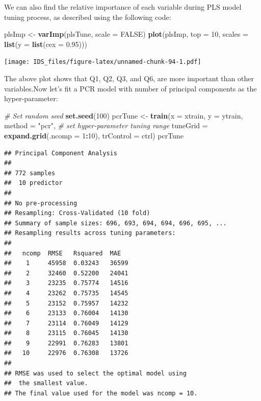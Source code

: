 \documentclass[12pt,]{krantz}
\makeatletter
\newenvironment{Shaded}{\begin{snugshade}}{\end{snugshade}}
\newcommand{\CommentTok}[1]{\textcolor[rgb]{0.37,0.37,0.37}{\textit{#1}}}
\newcommand{\DataTypeTok}[1]{\textcolor[rgb]{0.27,0.27,0.27}{#1}}
\newcommand{\DecValTok}[1]{\textcolor[rgb]{0.06,0.06,0.06}{#1}}
\newcommand{\FloatTok}[1]{\textcolor[rgb]{0.06,0.06,0.06}{#1}}
\newcommand{\KeywordTok}[1]{\textcolor[rgb]{0.27,0.27,0.27}{\textbf{#1}}}
\newcommand{\NormalTok}[1]{#1}
\newcommand{\OperatorTok}[1]{\textcolor[rgb]{0.43,0.43,0.43}{\textbf{#1}}}
\newcommand{\OtherTok}[1]{\textcolor[rgb]{0.37,0.37,0.37}{#1}}
\newcommand{\StringTok}[1]{\textcolor[rgb]{0.5,0.5,0.5}{#1}}
\newenvironment{kframe}{%
\medskip{}
\setlength{\fboxsep}{.8em}
 \def\at@end@of@kframe{}%
 \ifinner\ifhmode%
  \def\at@end@of@kframe{\end{minipage}}%
  \begin{minipage}{\columnwidth}%
 \fi\fi%
 \def\FrameCommand##1{\hskip\@totalleftmargin \hskip-\fboxsep
 \colorbox{shadecolor}{##1}\hskip-\fboxsep
     \hskip-\linewidth \hskip-\@totalleftmargin \hskip\columnwidth}%
 \MakeFramed {\advance\hsize-\width
   \@totalleftmargin\z@ \linewidth\hsize
   \@setminipage}}%
 {\par\unskip\endMakeFramed%
 \at@end@of@kframe}
\renewenvironment{Shaded}{\begin{kframe}}{\end{kframe}}
\makeatother
\begin{document}
We can also find the relative importance of each variable during PLS model tuning process, as described using the following code: 

\begin{Shaded}
\begin{Highlighting}[]
\NormalTok{plsImp <-}\StringTok{ }\KeywordTok{varImp}\NormalTok{(plsTune, }\DataTypeTok{scale =} \OtherTok{FALSE}\NormalTok{)}
\KeywordTok{plot}\NormalTok{(plsImp, }\DataTypeTok{top =} \DecValTok{10}\NormalTok{, }\DataTypeTok{scales =} \KeywordTok{list}\NormalTok{(}\DataTypeTok{y =} \KeywordTok{list}\NormalTok{(}\DataTypeTok{cex =} \FloatTok{0.95}\NormalTok{)))}
\end{Highlighting}
\end{Shaded}

\texttt{[image: IDS\_files/figure-latex/unnamed-chunk-94-1.pdf]}

The above plot shows that Q1, Q2, Q3, and Q6, are more important than other variables.Now let's fit a PCR model with number of principal components as the hyper-parameter: 

\begin{Shaded}
\begin{Highlighting}[]
\CommentTok{# Set random seed}
 \KeywordTok{set.seed}\NormalTok{(}\DecValTok{100}\NormalTok{)}
\NormalTok{ pcrTune <-}\StringTok{ }\KeywordTok{train}\NormalTok{(}\DataTypeTok{x =}\NormalTok{ xtrain, }\DataTypeTok{y =}\NormalTok{ ytrain,}
          \DataTypeTok{method =} \StringTok{"pcr"}\NormalTok{,}
          \CommentTok{# set hyper-parameter tuning range}
          \DataTypeTok{tuneGrid =} \KeywordTok{expand.grid}\NormalTok{(}\DataTypeTok{.ncomp =} \DecValTok{1}\OperatorTok{:}\DecValTok{10}\NormalTok{),}
          \DataTypeTok{trControl =}\NormalTok{ ctrl)}
\NormalTok{ pcrTune}
\end{Highlighting}
\end{Shaded}

\begin{verbatim}
## Principal Component Analysis 
## 
## 772 samples
##  10 predictor
## 
## No pre-processing
## Resampling: Cross-Validated (10 fold) 
## Summary of sample sizes: 696, 693, 694, 694, 696, 695, ... 
## Resampling results across tuning parameters:
## 
##   ncomp  RMSE   Rsquared  MAE  
##    1     45958  0.03243   36599
##    2     32460  0.52200   24041
##    3     23235  0.75774   14516
##    4     23262  0.75735   14545
##    5     23152  0.75957   14232
##    6     23133  0.76004   14130
##    7     23114  0.76049   14129
##    8     23115  0.76045   14130
##    9     22991  0.76283   13801
##   10     22976  0.76308   13726
## 
## RMSE was used to select the optimal model using
##  the smallest value.
## The final value used for the model was ncomp = 10.
\end{verbatim}
\end{document}
